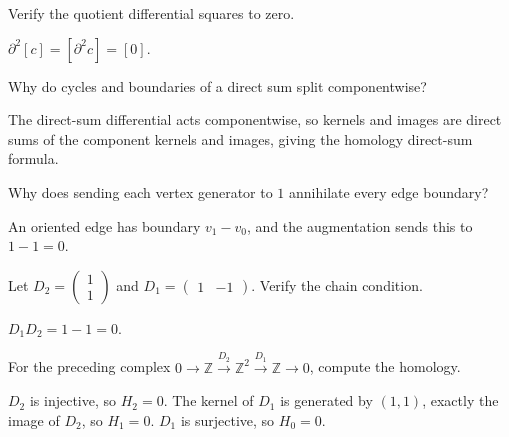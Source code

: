 \begin{problem}\label{prob:viii16-11}
Verify the quotient differential squares to zero.
\end{problem}
\begin{solution}
\(\partial^2[c]=[\partial^2c]=[0]\).
\end{solution}

\begin{problem}\label{prob:viii16-12}
Why do cycles and boundaries of a direct sum split componentwise?
\end{problem}
\begin{solution}
The direct-sum differential acts componentwise, so kernels and images are direct sums of the component kernels and images, giving the homology direct-sum formula.
\end{solution}

\begin{problem}\label{prob:viii16-13}
Why does sending each vertex generator to \(1\) annihilate every edge boundary?
\end{problem}
\begin{solution}
An oriented edge has boundary \(v_1-v_0\), and the augmentation sends this to \(1-1=0\).
\end{solution}

\begin{problem}\label{prob:viii16-14}
Let \(D_2=\begin{pmatrix}1\\1\end{pmatrix}\) and \(D_1=\begin{pmatrix}1&-1\end{pmatrix}\). Verify the chain condition.
\end{problem}
\begin{solution}
\(D_1D_2=1-1=0\).
\end{solution}

\begin{problem}\label{prob:viii16-15}
For the preceding complex \(0\to\mathbb Z\xrightarrow{D_2}\mathbb Z^2\xrightarrow{D_1}\mathbb Z\to0\), compute the homology.
\end{problem}
\begin{solution}
\(D_2\) is injective, so \(H_2=0\). The kernel of \(D_1\) is generated by \((1,1)\), exactly the image of \(D_2\), so \(H_1=0\). \(D_1\) is surjective, so \(H_0=0\).
\end{solution}

